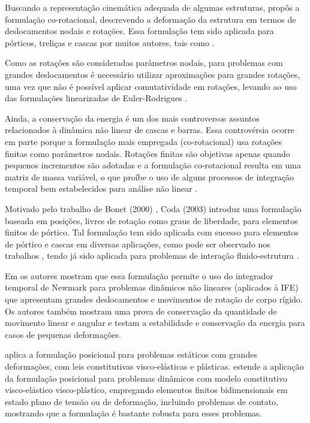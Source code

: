 \documentclass[_ArquivoPrincipal.tex]{subfiles}
\begin{document}
Buscando a representação cinemática adequada de algumas estruturas, \cite{Truesdell:1955} propôs a for\-mu\-la\-ção co-rotacional, descrevendo a deformação da estrutura em termos de deslocamentos nodais e rotações. Essa formulação tem sido aplicada para pórticos, treliças e cascas por muitos autores, tais como \cite{HughesL:1981a,SimoF:1989,Ibrahimbegovic:2002,Argyris:1982,BattiniP:2006}.

Como as rotações são consideradas parâmetros nodais, para problemas com grandes deslocamentos é necessário utilizar aproximações para grandes rotações, uma vez que não é possível aplicar comutatividade em rotações, levando ao uso das formulações linearizadas de Euler-Rodrigues \cite{CodaP:2010}.

Ainda, a conservação da energia é um dos mais controversos assuntos relacionados à di\-nâ\-mi\-ca não linear de cascas e barras. Essa controvérsia ocorre em parte porque a formulação mais empregada (co-rotacional) usa rotações finitas como parâmetros nodais. Rotações finitas são objetivas apenas quando pequenos incrementos são adotadas e a formulação co-rotacional resulta em uma matriz de massa variável, o que proíbe o uso de alguns processos de integração temporal bem estabelecidos para análise não linear \cite{SanchesC:2013}.

Motivado pelo trabalho de Bonet (2000) \cite{Bonet:2000}, Coda (2003) \cite{Coda:2003} introduz uma formulação baseada em posições, livres de rotação como graus de liberdade, para elementos finitos de pórtico. Tal formulação tem sido aplicada com sucesso para elementos de pórtico e cascas em diversas aplicações, como pode ser observado nos trabalhos \cite{CodaandGreco2004,CodaP:2010,Coda2011319,Carrazedo20101008,SanchesC:2017}, tendo já sido aplicada para problemas de interação fluido-estrutura \cite{SanchesC:2014,SanchesC:2013, FernandesCS:2018}.

Em \cite{SanchesC:2013} os autores mostram que essa formulação permite o uso do integrador temporal de Newmark para problemas dinâmicos não lineares (aplicados à IFE) que apresentam grandes deslocamentos e movimentos de rotação de corpo rígido. Os autores também mostram uma prova de conservação da quantidade de movimento linear e angular e testam a estabilidade e conservação da energia para casos de pequenas deformações.

 aplica a formulação posicional para problemas estáticos com grandes deformações, com leis constitutivas visco-elásticas e plásticas.  estende a aplicação da formulação posicional para problemas dinâmicos com modelo constitutivo visco-elástico visco-plástico, empregando elementos finitos bidimensionais em estado plano de tensão ou de deformação, incluindo problemas de contato, mostrando que a formulação é bastante robusta para esses problemas.
\end{document}
